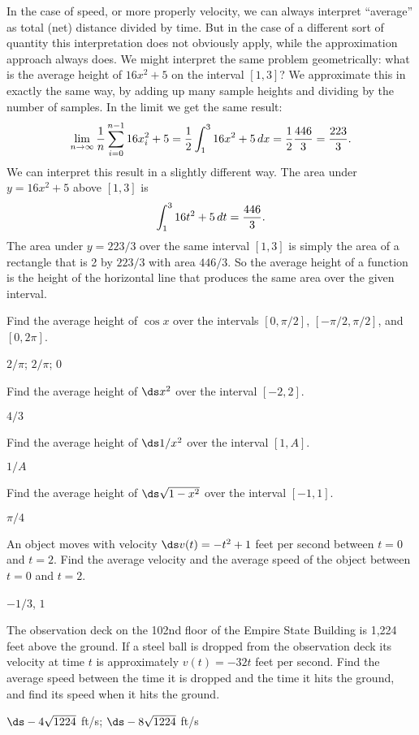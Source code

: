 In the case of speed, or more properly velocity, we can always
interpret ``average'' as total (net) distance divided by time. But in
the case of a different sort of quantity this interpretation does not
obviously apply, while the approximation approach always does. We might
interpret the same problem geometrically: what is the average height
of $16x^2+5$ on the interval $[1,3]$? We approximate this in exactly
the same way, by adding up many sample heights and dividing by the
number of samples. In the limit we get the same result:
$$
  \lim_{n\to\infty}{1\over n}\sum_{i=0}^{n-1} 16x_i^2+5=
  {1\over 2}\int_1^3 16x^2+5\,dx={1\over 2}{446\over 3}={223\over 3}.
$$
We can interpret this result in a slightly different way. The area
under $y=16x^2+5$ above $[1,3]$ is
$$\int_1^3 16t^2+5\,dt={446\over 3}.$$ 
The area under $y=223/3$ over the same interval $[1,3]$ is simply the
area of a rectangle that is 2 by $223/3$ with area $446/3$. So the
average height of a function is the height of the horizontal line that
produces the same area over the given interval.

\begin{exercises}

\exercise Find the average height of $\cos x$ over the intervals
$[0,\pi/2]$, $[-\pi/2,\pi/2]$, and $[0,2\pi]$.
\begin{answer} $2/\pi$; $2/\pi$; $0$
\end{answer}

\exercise Find the average height of $\ds x^2$ over the interval
$[-2,2]$.
\begin{answer} $4/3$
\end{answer}

\exercise Find the average height of $\ds 1/x^2$ over the interval
$[1,A]$.
\begin{answer} $1/A$
\end{answer}

\exercise Find the average height of $\ds \sqrt{1-x^2}$ over the interval
$[-1,1]$.
\begin{answer} $\pi/4$
\end{answer}

\exercise An object moves with velocity $\ds v(t)=-t^2+1$ feet per second
between $t=0$ and $t=2$. Find the average velocity and the average
speed of the object between $t=0$ and $t=2$.
\begin{answer} $-1/3$, $1$
\end{answer}

\exercise The observation deck on the 102nd floor of the Empire State Building
is 1,224 feet above the ground. If a steel ball is dropped from the
observation deck its velocity at time $t$ is approximately $v(t)=-32t$
feet per second. Find the average speed between the time it is dropped
and the time it hits the ground, and find its speed when it hits the
ground.
\begin{answer} $\ds -4\sqrt{1224}$ ft/s; $\ds -8\sqrt{1224}$ ft/s
\end{answer}

\end{exercises}

